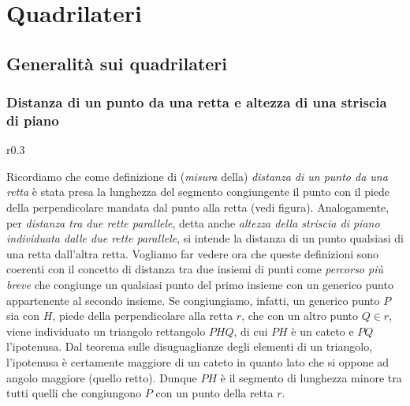 
\chapter{Quadrilateri}\label{chap:quadrilateri}


\section{Generalità sui quadrilateri} 
  \label{sect:generalita_quadrilateri}

\subsection{Distanza di un punto da una retta e altezza di una 
  striscia di piano}

\begin{wrapfigure}{r}{0.3\textwidth}
  \centering
\end{wrapfigure}
Ricordiamo che come definizione di (\emph{misura} della) 
\emph{distanza di un punto da una retta} è stata presa la lunghezza 
del segmento congiungente il punto con il piede della perpendicolare 
mandata dal punto alla retta (vedi figura). Analogamente, per 
\emph{distanza tra due rette parallele}, detta anche \emph{altezza 
  della striscia di piano individuata dalle due rette parallele}, si 
intende la distanza di un punto qualsiasi di una retta dall'altra 
retta. Vogliamo far vedere ora che queste definizioni sono coerenti 
con il concetto di distanza tra due insiemi di punti come 
\emph{percorso più breve} che congiunge un qualsiasi punto del primo 
insieme con un generico punto appartenente al secondo insieme. Se 
congiungiamo, infatti, un generico punto $P$ sia con $H$, piede della 
perpendicolare alla retta $r$, che con un altro punto $Q\in r$, viene 
individuato un triangolo rettangolo $PHQ$, di cui $PH$ è un cateto e 
$PQ$ l'ipotenusa. Dal teorema sulle disuguaglianze degli elementi di 
un triangolo, l'ipotenusa è certamente maggiore di un cateto in 
quanto lato che si oppone ad angolo maggiore (quello retto). Dunque 
$PH$ è il segmento di lunghezza minore tra tutti quelli che 
congiungono $P$ con un punto della retta $r$.


